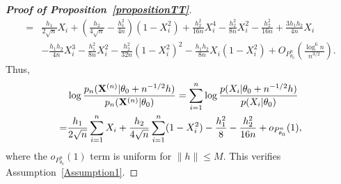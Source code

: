 \documentclass[11pt]{article}
\theoremstyle{plain}
\theoremstyle{definition}
\theoremstyle{remark}
\begin{document}
\begin{appendices}
\begin{proof}[\textbf{Proof of Proposition~\ref{propositionTT}}]
\begin{equation*}
\begin{split}
    =&
\frac{h_1}{2\sqrt{n}} X_i
+\left(\frac{h_2}{4\sqrt{n}}-\frac{h_1^2}{4n}\right)
        (1-X_i^2)
    +\frac{h_2^2}{16n}X_i^4 
    -\frac{h_2^2}{8n}X_i^2
-\frac{h_2^2}{16n}
+\frac{3 h_1 h_2}{4 n}  X_i
\\
     &-\frac{h_1 h_2}{4 n}X_i^3
     -\frac{h_1^2}{8n}X_i^2
     -\frac{h_2^2}{32n}(1-X_i^2)^2
     -\frac{h_1 h_2}{8n}X_i(1-X_i^2)
     +O_{P^n_{\theta_0}}\left(\frac{\log^6 n}{n^{3/2}}\right).
    \end{split}
\end{equation*}
Thus,
\begin{equation*}
    \begin{split}
        &
        \log 
        \frac{p_n(\mathbf{X}^{(n)}|\theta_0+n^{-1/2}h)}{p_n(\mathbf{X}^{(n)}|\theta_0)}=
        \sum_{i=1}^n\log \frac{p(X_i|\theta_0+n^{-1/2}h)}{p(X_i|\theta_0)}
    \\
    =&
    \frac{h_1}{2\sqrt{n}} \sum_{i=1}^n X_i
+
\frac{h_2}{4\sqrt{n}} \sum_{i=1}^n (1-X_i^2)
     -\frac{h_1^2}{8}
     -\frac{h_2^2}{16n}
     +o_{P^n_{\theta_0}}(1),
    \end{split}
\end{equation*}
where the $o_{P^n_{\theta_0}}(1)$ term is uniform for $\|h\|\leq M$.
This verifies Assumption~\ref{Assumption1}.


\end{proof}
\end{appendices}
\end{document}
